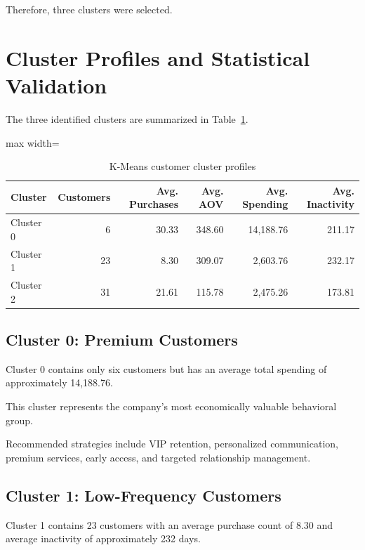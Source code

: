 \documentclass[11pt,a4paper]{article}
\begin{document}
Therefore, three clusters were selected.


\section{Cluster Profiles and Statistical Validation}

The three identified clusters are summarized in Table~\ref{tab:clusters}.

\begin{table}[H]
\centering
\caption{K-Means customer cluster profiles}
\label{tab:clusters}
\begin{adjustbox}{max width=\textwidth}
\begin{tabular}{lrrrrr}
\toprule
\textbf{Cluster} &
\textbf{Customers} &
\textbf{Avg. Purchases} &
\textbf{Avg. AOV} &
\textbf{Avg. Spending} &
\textbf{Avg. Inactivity}\\
\midrule
Cluster 0 & 6 & 30.33 & 348.60 & 14,188.76 & 211.17\\
Cluster 1 & 23 & 8.30 & 309.07 & 2,603.76 & 232.17\\
Cluster 2 & 31 & 21.61 & 115.78 & 2,475.26 & 173.81\\
\bottomrule
\end{tabular}
\end{adjustbox}
\end{table}

\subsection{Cluster 0: Premium Customers}

Cluster 0 contains only six customers but has an average total spending of approximately 14,188.76.

This cluster represents the company's most economically valuable behavioral group.

Recommended strategies include VIP retention, personalized communication, premium services, early access, and targeted relationship management.

\subsection{Cluster 1: Low-Frequency Customers}

Cluster 1 contains 23 customers with an average purchase count of 8.30 and average inactivity of approximately 232 days.
\end{document}
